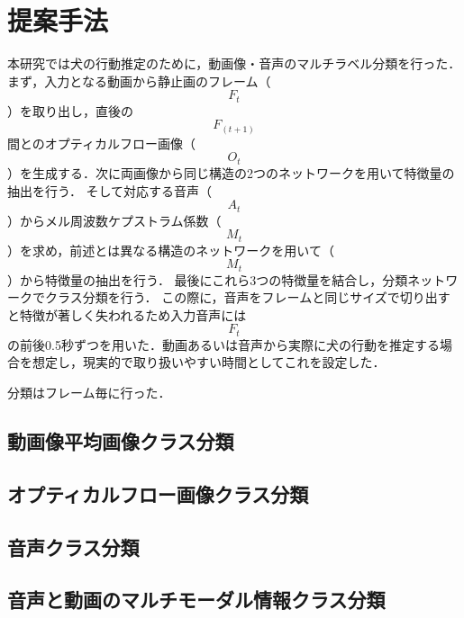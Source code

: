 \chapter{提案手法}
本研究では犬の行動推定のために，動画像・音声のマルチラベル分類を行った．
まず，入力となる動画から静止画のフレーム（\[F_t\]）を取り出し，直後の\[F_(t+1)\]間とのオプティカルフロー画像（\[O_t\]）を生成する．次に両画像から同じ構造の2つのネットワークを用いて特徴量の抽出を行う．
そして対応する音声（\[A_t\]）からメル周波数ケプストラム係数（\[M_t\]）を求め，前述とは異なる構造のネットワークを用いて（\[M_t\]）から特徴量の抽出を行う．
最後にこれら3つの特徴量を結合し，分類ネットワークでクラス分類を行う．
この際に，音声をフレームと同じサイズで切り出すと特徴が著しく失われるため入力音声には\[F_t\]の前後0.5秒ずつを用いた．動画あるいは音声から実際に犬の行動を推定する場合を想定し，現実的で取り扱いやすい時間としてこれを設定した．

分類はフレーム毎に行った．
\section{動画像平均画像クラス分類}
\section{オプティカルフロー画像クラス分類}
\section{音声クラス分類}
\section{音声と動画のマルチモーダル情報クラス分類}

